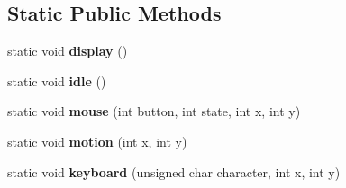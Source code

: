\subsection*{Static Public Methods}
\begin{DoxyCompactItemize}
\item 
\mbox{\label{struct_glut_viewer_a88ec1ef1e42cdf6daa6e93cebfa3cdae}} 
static void {\bfseries display} ()
\item 
\mbox{\label{struct_glut_viewer_ac94c554f4339d0ff55c5cca9d1be2676}} 
static void {\bfseries idle} ()
\item 
\mbox{\label{struct_glut_viewer_a25fa4839d244f5f221c3fb346cdbe584}} 
static void {\bfseries mouse} (int button, int state, int x, int y)
\item 
\mbox{\label{struct_glut_viewer_a88c7d9e7144e1dae7bd9b5e2d409a9d9}} 
static void {\bfseries motion} (int x, int y)
\item 
\mbox{\label{struct_glut_viewer_a738d02267b5482162d1c059e43257fb5}} 
static void {\bfseries keyboard} (unsigned char character, int x, int y)
\end{DoxyCompactItemize}
